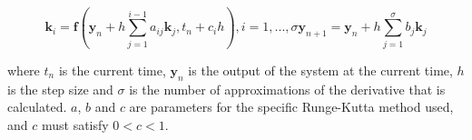\begin{subequations}
\begin{equation}
	\mathbf{k}_i = \mathbf{f}(\mathbf{y}_n + h \sum_{j=1}^{i-1} a_{ij}\mathbf{k}_j, t_n + c_ih), i = 1, ..., \sigma
\end{equation}
\begin{equation}
	\mathbf{y}_{n+1} = \mathbf{y}_n + h \sum_{j=1}^\sigma b_j \mathbf{k}_j
\end{equation}
\end{subequations}

where $t_n$ is the current time, $\mathbf{y}_n$ is the output of the system at the current time, $h$ is the step size and $\sigma$ is the number of approximations of the derivative that is calculated. $a$, $b$ and $c$ are parameters for the specific Runge-Kutta method used, and $c$ must satisfy $0 < c < 1$.




